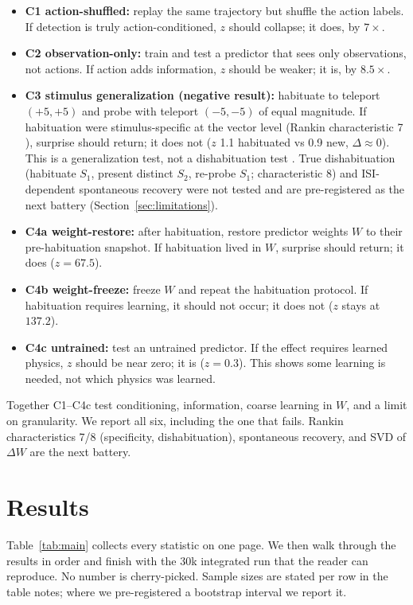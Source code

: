 \documentclass[11pt,a4paper]{article}
\begin{document}
\begin{itemize}[leftmargin=1.2em]
    \item \textbf{C1 action-shuffled:} replay the same trajectory but shuffle the action labels. If detection is truly action-conditioned, $z$ should collapse; it does, by $7\times$.
    \item \textbf{C2 observation-only:} train and test a predictor that sees only observations, not actions. If action adds information, $z$ should be weaker; it is, by $8.5\times$.
    \item \textbf{C3 stimulus generalization (negative result):} habituate to teleport $(+5,+5)$ and probe with teleport $(-5,-5)$ of equal magnitude. If habituation were stimulus-specific at the vector level (Rankin characteristic 7 \cite{rankin2009}), surprise should return; it does not ($z$ 1.1 habituated vs 0.9 new, $\Delta\approx0$). This is a generalization test, not a dishabituation test \cite{rankin2009}. True dishabituation (habituate $S_1$, present distinct $S_2$, re-probe $S_1$; characteristic 8) and ISI-dependent spontaneous recovery \cite{thompson1966} were not tested and are pre-registered as the next battery (Section~\ref{sec:limitations}).
    \item \textbf{C4a weight-restore:} after habituation, restore predictor weights $W$ to their pre-habituation snapshot. If habituation lived in $W$, surprise should return; it does ($z=67.5$).
    \item \textbf{C4b weight-freeze:} freeze $W$ and repeat the habituation protocol. If habituation requires learning, it should not occur; it does not ($z$ stays at $137.2$).
    \item \textbf{C4c untrained:} test an untrained predictor. If the effect requires learned physics, $z$ should be near zero; it is ($z=0.3$). This shows some learning is needed, not which physics was learned.
\end{itemize}

Together C1--C4c test conditioning, information, coarse learning in $W$, and a limit on granularity. We report all six, including the one that fails. Rankin characteristics 7/8 (specificity, dishabituation), spontaneous recovery, and SVD of $\Delta W$ are the next battery.

\section{Results}
\label{sec:results}

Table~\ref{tab:main} collects every statistic on one page. We then walk through the results in order and finish with the 30k integrated run that the reader can reproduce. No number is cherry-picked. Sample sizes are stated per row in the table notes; where we pre-registered a bootstrap interval we report it.
\end{document}
